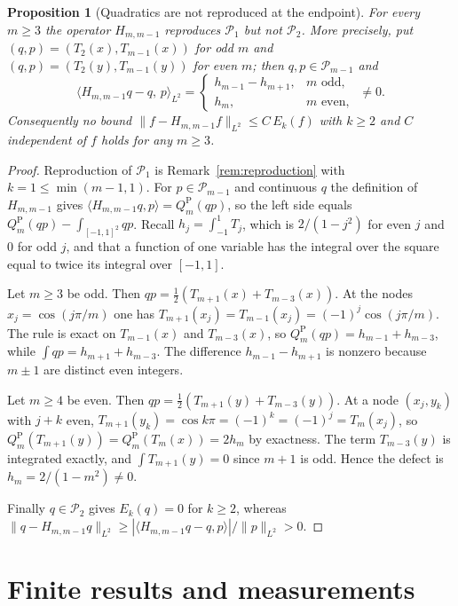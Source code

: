 \documentclass[preprint,12pt,a4paper]{elsarticle}
\newtheorem{proposition}[theorem]{Proposition}
\theoremstyle{remark}
\newcommand{\Pa}{\mathrm P}
\begin{document}
\begin{proposition}[Quadratics are not reproduced at the endpoint]\label{prop:no-quadratics}
For every $m\ge3$ the operator $H_{m,m-1}$ reproduces $\mathcal P_1$ but not
$\mathcal P_2$. More precisely, put $(q,p)=(T_2(x),T_{m-1}(x))$ for odd $m$ and
$(q,p)=(T_2(y),T_{m-1}(y))$ for even $m$; then $q,p\in\mathcal P_{m-1}$ and
\[
 \langle H_{m,m-1}q-q,\,p\rangle_{L^2}=
 \begin{cases}h_{m-1}-h_{m+1},& m\text{ odd},\\ h_m,&m\text{ even},\end{cases}
 \ \ne0 .
\]
Consequently no bound $\|f-H_{m,m-1}f\|_{L^2}\le C\,E_k(f)$ with $k\ge2$ and
$C$ independent of $f$ holds for any $m\ge3$.
\end{proposition}
\begin{proof}
Reproduction of $\mathcal P_1$ is Remark~\ref{rem:reproduction} with $k=1\le\min(m-1,1)$.
For $p\in\mathcal P_{m-1}$ and continuous $q$ the definition of $H_{m,m-1}$
gives $\langle H_{m,m-1}q,p\rangle=Q_m^\Pa(qp)$, so the left side equals
$Q_m^\Pa(qp)-\int_{[-1,1]^2}qp$. Recall $h_j=\int_{-1}^1T_j$, which is
$2/(1-j^2)$ for even $j$ and $0$ for odd $j$, and that a function of one
variable has the integral over the square equal to twice its integral over
$[-1,1]$.

Let $m\ge3$ be odd. Then $qp=\frac12(T_{m+1}(x)+T_{m-3}(x))$. At the nodes
$x_j=\cos(j\pi/m)$ one has $T_{m+1}(x_j)=T_{m-1}(x_j)=(-1)^j\cos(j\pi/m)$.
The rule is exact on $T_{m-1}(x)$ and $T_{m-3}(x)$, so
$Q_m^\Pa(qp)=h_{m-1}+h_{m-3}$, while $\int qp=h_{m+1}+h_{m-3}$. The
difference $h_{m-1}-h_{m+1}$ is nonzero because $m\pm1$ are distinct even
integers.

Let $m\ge4$ be even. Then $qp=\frac12(T_{m+1}(y)+T_{m-3}(y))$. At a node
$(x_j,y_k)$ with $j+k$ even, $T_{m+1}(y_k)=\cos k\pi=(-1)^k=(-1)^j=T_m(x_j)$,
so $Q_m^\Pa(T_{m+1}(y))=Q_m^\Pa(T_m(x))=2h_m$ by exactness. The term
$T_{m-3}(y)$ is integrated exactly, and $\int T_{m+1}(y)=0$ since $m+1$ is
odd. Hence the defect is $h_m=2/(1-m^2)\ne0$.

Finally $q\in\mathcal P_2$ gives $E_k(q)=0$ for $k\ge2$, whereas
$\|q-H_{m,m-1}q\|_{L^2}\ge|\langle H_{m,m-1}q-q,p\rangle|/\|p\|_{L^2}>0$.
\end{proof}

\section{Finite results and measurements}\label{sec:numerics}
\end{document}
